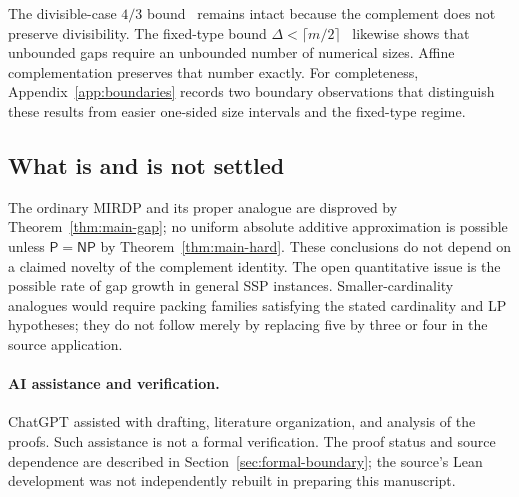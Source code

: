 \documentclass[11pt,a4paper]{article}
\theoremstyle{definition}
\theoremstyle{remark}
\newcommand{\Pclass}{\mathsf P}
\newcommand{\NPclass}{\mathsf{NP}}
\begin{document}
The divisible-case $4/3$ bound~\cite{M22} remains intact because the complement does not preserve divisibility. The fixed-type bound $\Delta<\lceil m/2\rceil$~\cite{MS19} likewise shows that unbounded gaps require an unbounded number of numerical sizes. Affine complementation preserves that number exactly. For completeness, Appendix~\ref{app:boundaries} records two boundary observations that distinguish these results from easier one-sided size intervals and the fixed-type regime.

\subsection{What is and is not settled}
The ordinary MIRDP and its proper analogue are disproved by Theorem~\ref{thm:main-gap}; no uniform absolute additive approximation is possible unless $\Pclass=\NPclass$ by Theorem~\ref{thm:main-hard}. These conclusions do not depend on a claimed novelty of the complement identity. The open quantitative issue is the possible rate of gap growth in general SSP instances. Smaller-cardinality analogues would require packing families satisfying the stated cardinality and LP hypotheses; they do not follow merely by replacing five by three or four in the source application.

\paragraph{AI assistance and verification.}
ChatGPT assisted with drafting, literature organization, and analysis of the proofs. Such assistance is not a formal verification. The proof status and source dependence are described in Section~\ref{sec:formal-boundary}; the source's Lean development was not independently rebuilt in preparing this manuscript.

\appendix
\end{document}
